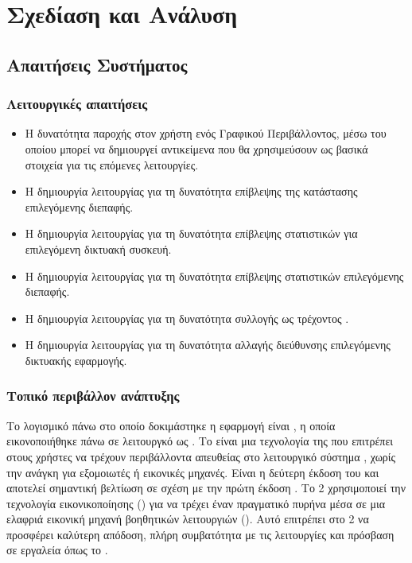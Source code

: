 \chapter{Σχεδίαση και Ανάλυση}

\section{Απαιτήσεις Συστήματος}




\subsection{Λειτουργικές απαιτήσεις}

\begin{itemize}
	\item Η δυνατότητα παροχής στον χρήστη ενός Γραφικού Περιβάλλοντος, μέσω του οποίου μπορεί να δημιουργεί αντικείμενα που θα χρησιμεύσουν ως βασικά στοιχεία για τις επόμενες λειτουργίες.
    \item Η δημιουργία λειτουργίας για τη δυνατότητα επίβλεψης της κατάστασης επιλεγόμενης διεπαφής.
    \item Η δημιουργία λειτουργίας για τη δυνατότητα επίβλεψης στατιστικών για επιλεγόμενη δικτυακή συσκευή.
    \item Η δημιουργία λειτουργίας για τη δυνατότητα επίβλεψης στατιστικών επιλεγόμενης διεπαφής.
    \item Η δημιουργία λειτουργίας για τη δυνατότητα συλλογής ως  τρέχοντος .
    \item Η δημιουργία λειτουργίας για τη δυνατότητα αλλαγής  διεύθυνσης επιλεγόμενης δικτυακής εφαρμογής.
\end{itemize}

\subsection{Τοπικό περιβάλλον ανάπτυξης}

Το λογισμικό πάνω στο οποίο δοκιμάστηκε η εφαρμογή είναι ,  η οποία εικονοποιήθηκε πάνω σε λειτουργκό  ως . 
Το  είναι μια τεχνολογία της  που επιτρέπει στους χρήστες  να τρέχουν  
περιβάλλοντα απευθείας στο λειτουργικό σύστημα , χωρίς την ανάγκη για εξομοιωτές ή εικονικές μηχανές. 
Είναι η δεύτερη έκδοση του  και αποτελεί σημαντική βελτίωση σε σχέση με την πρώτη έκδοση . Το  2 χρησιμοποιεί την τεχνολογία εικονικοποίησης () για να 
τρέχει έναν πραγματικό πυρήνα  μέσα σε μια ελαφριά εικονική μηχανή βοηθητικών λειτουργιών (). Αυτό επιτρέπει στο  2 να προσφέρει 
καλύτερη απόδοση, πλήρη συμβατότητα με τις λειτουργίες  και πρόσβαση σε εργαλεία όπως το .

